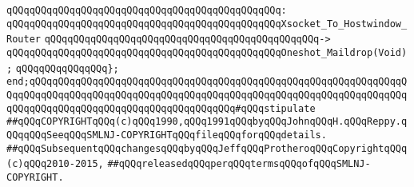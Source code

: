 \verb|qQQqqQQqqQQqqQQqqQQqqQQqqQQqqQQqqQQqqQQqqQQqqQQq:|\newline
\verb|qQQqqQQqqQQqqQQqqQQqqQQqqQQqqQQqqQQqqQQqqQQqqQQqXsocket_To_Hostwindow_Router|\newline
\verb|qQQqqQQqqQQqqQQqqQQqqQQqqQQqqQQqqQQqqQQqqQQqqQQq->|\newline
\verb|qQQqqQQqqQQqqQQqqQQqqQQqqQQqqQQqqQQqqQQqqQQqqQQqOneshot_Maildrop(Void);|\newline
\newline
\verb|qQQqqQQqqQQqqQQq};|\newline
\verb|end;qQQqqQQqqQQqqQQqqQQqqQQqqQQqqQQqqQQqqQQqqQQqqQQqqQQqqQQqqQQqqQQqqQQqqQQqqQQqqQQqqQQqqQQqqQQqqQQqqQQqqQQqqQQqqQQqqQQqqQQqqQQqqQQqqQQqqQQqqQQqqQQqqQQqqQQqqQQqqQQqqQQqqQQqqQQqqQQq#qQQqstipulate|\newline
\newline
\newline
\newline
\verb|##qQQqCOPYRIGHTqQQq(c)qQQq1990,qQQq1991qQQqbyqQQqJohnqQQqH.qQQqReppy.qQQqqQQqSeeqQQqSMLNJ-COPYRIGHTqQQqfileqQQqforqQQqdetails.|\newline
\verb|##qQQqSubsequentqQQqchangesqQQqbyqQQqJeffqQQqProtheroqQQqCopyrightqQQq(c)qQQq2010-2015,|\newline
\verb|##qQQqreleasedqQQqperqQQqtermsqQQqofqQQqSMLNJ-COPYRIGHT.|\newline

